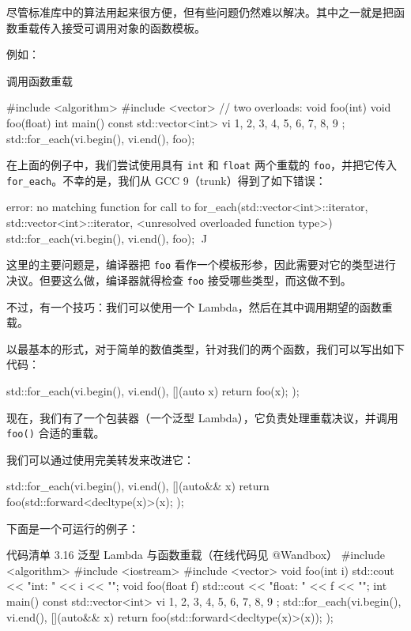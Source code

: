 尽管标准库中的算法用起来很方便，但有些问题仍然难以解决。其中之一就是把函数重载传入接受可调用对象的函数模板。

例如：

调用函数重载

\begin{codebox}
#include <algorithm>
#include <vector>
// two overloads:
void foo(int) {}
void foo(float) {}
int main() {
const std::vector<int> vi { 1, 2, 3, 4, 5, 6, 7, 8, 9 };
std::for_each(vi.begin(), vi.end(), foo);
}
\end{codebox}

在上面的例子中，我们尝试使用具有 \texttt{int} 和 \texttt{float} 两个重载的 \texttt{foo}，并把它传入 \texttt{for\_each}。不幸的是，我们从 GCC 9（trunk）得到了如下错误：

\begin{codebox}
error: no matching function for call to
for_each(std::vector<int>::iterator, std::vector<int>::iterator,
<unresolved overloaded function type>)
std::for_each(vi.begin(), vi.end(), foo);
^^^^^
\end{codebox}

这里的主要问题是，编译器把 \texttt{foo} 看作一个模板形参，因此需要对它的类型进行决议。但要这么做，编译器就得检查 \texttt{foo} 接受哪些类型，而这做不到。

不过，有一个技巧：我们可以使用一个 Lambda，然后在其中调用期望的函数重载。

以最基本的形式，对于简单的数值类型，针对我们的两个函数，我们可以写出如下代码：

\begin{codebox}
std::for_each(vi.begin(), vi.end(), [](auto x) { return foo(x); });
\end{codebox}

现在，我们有了一个包装器（一个泛型 Lambda），它负责处理重载决议，并调用 \texttt{foo()} 合适的重载。

我们可以通过使用完美转发来改进它：

\begin{codebox}
std::for_each(vi.begin(), vi.end(), [](auto&& x) {
return foo(std::forward<decltype(x)>(x); }
);
\end{codebox}

下面是一个可运行的例子：

\begin{codeboxt}{代码清单 3.16 泛型 Lambda 与函数重载（在线代码见 @Wandbox）}
#include <algorithm>
#include <iostream>
#include <vector>
void foo(int i) { std::cout << "int: " << i << "\n"; }
void foo(float f) { std::cout << "float: " << f << "\n"; }
int main() {
const std::vector<int> vi { 1, 2, 3, 4, 5, 6, 7, 8, 9 };
std::for_each(vi.begin(), vi.end(), [](auto&& x) {
return foo(std::forward<decltype(x)>(x));
});
}
\end{codeboxt}

